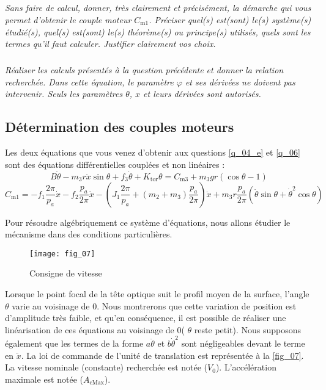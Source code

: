 \subparagraph{\label{q_05}}\textit{Sans faire de calcul, donner, très clairement et précisément, la démarche qui vous permet d’obtenir
le couple moteur $C_{\text{m1}}$. Préciser quel(s) est(sont) le(s) système(s) étudié(s), quel(s) est(sont) le(s)
théorème(s) ou principe(s) utilisés, quels sont les termes qu’il faut calculer. Justifier clairement vos
choix.}

\subparagraph{\label{q_06}}\textit{Réaliser les calculs présentés à la question précédente et donner la relation recherchée. Dans cette équation, le paramètre $\varphi$ et ses dérivées ne doivent pas intervenir. Seuls
les paramètres $\theta$, $x$ et leurs dérivées sont autorisés.}

\subsection{Détermination des couples moteurs}
Les deux équations que vous venez d’obtenir aux
questions \ref{q_04_e} et \ref{q_06} sont des équations différentielles
couplées et non linéaires :
$$ B\ddot{\theta} -m_3 r\ddot{x} \sin \theta + f_3\dot{\theta} + K_{\text{tor}} \theta = 
C_{\text{m3}}+m_3gr\left(\cos\theta - 1\right)$$
$$ C_{\text{m1}} = 
-f_1 \dfrac{2\pi }{p_a} \dot{x}
-f_2 \dfrac{p_a}{2\pi } \dot{x}
- \left( J_1 \dfrac{2\pi }{p_a} + \left(m_2+m_3\right)\dfrac{p_a}{2\pi } \right)\ddot{x}
+ m_3 r \dfrac{p_a}{2\pi }\left(\ddot{\theta}\sin\theta + \dot{\theta}^2\cos\theta\right)
$$

 Pour résoudre algébriquement ce système d’équations, nous allons
étudier le mécanisme dans des conditions
particulières.

\begin{figure}[H]
\centering
\texttt{[image: fig\_07]}
\caption{\label{fig_07} Consigne de vitesse}
\end{figure}

Lorsque le point focal de la tête optique suit le profil
moyen de la surface, l’angle $\theta$ varie au voisinage
de 0\degres. Nous montrerons %
que cette
variation de position est d’amplitude très faible, et
qu’en conséquence, il est possible de réaliser une linéarisation de ces équations au voisinage de 0\degres ( $\theta$ reste
petit). Nous supposons également que les termes de la forme $a\ddot{\theta}$  et $b\dot{\theta}^2$ sont négligeables devant le terme en $\ddot{x}$.
La loi de commande de l’unité de translation est représentée à la \autoref{fig_07}. La vitesse nominale (constante)
recherchée est notée ($V_0$). L’accélération maximale est notée ($A_{\text{cMax}}$).

